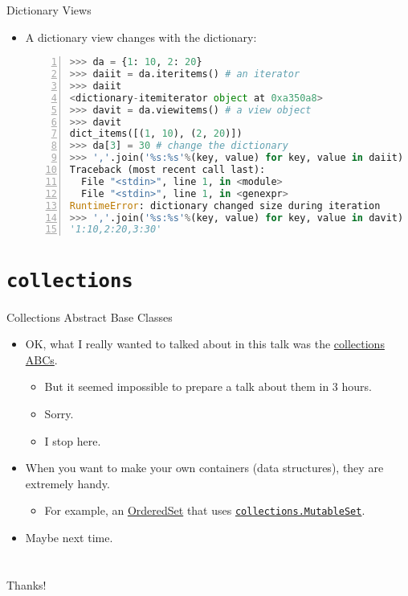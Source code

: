 \documentclass[dvips,xcolor=pst,14pt]{beamer}
\begin{document}
\begin{frame}[fragile]{
%
Dictionary Views
%
}
\begin{itemize}
\item A dictionary view changes with the dictionary:
  \begin{lstlisting}[basicstyle=\scriptsize\ttfamily,numbers=left,language=Python]
>>> da = {1: 10, 2: 20}
>>> daiit = da.iteritems() # an iterator
>>> daiit
<dictionary-itemiterator object at 0xa350a8>
>>> davit = da.viewitems() # a view object
>>> davit
dict_items([(1, 10), (2, 20)])
>>> da[3] = 30 # change the dictionary
>>> ','.join('%s:%s'%(key, value) for key, value in daiit)
Traceback (most recent call last):
  File "<stdin>", line 1, in <module>
  File "<stdin>", line 1, in <genexpr>
RuntimeError: dictionary changed size during iteration
>>> ','.join('%s:%s'%(key, value) for key, value in davit)
'1:10,2:20,3:30'
  \end{lstlisting}
\end{itemize}
\end{frame}

\section{
\texttt{collections}
}

\begin{frame}[fragile]{
%
Collections Abstract Base Classes
%
}
\begin{itemize}
\item OK, what I really wanted to talked about in this talk was the
\href{http://docs.python.org/2/library/collections.html#collections-abstract-base-classes}{collections
ABCs}.
  \begin{itemize}
  \item But it seemed impossible to prepare a talk about them in 3 hours.
  \item Sorry.
  \item I stop here.
  \end{itemize}
\item When you want to make your own containers (data structures), they are
extremely handy.
  \begin{itemize}
  \item For example, an
  \href{http://code.activestate.com/recipes/576694/}{OrderedSet} that uses
  \href{http://docs.python.org/2/library/collections.html#collections.MutableSet}{\texttt{collections.MutableSet}}.
  \end{itemize}
\item Maybe next time.
\end{itemize}
\end{frame}

\section*{
}

\begin{frame}{
%
%
}
\begin{center}
Thanks!
\end{center}
\end{frame}
\end{document}
